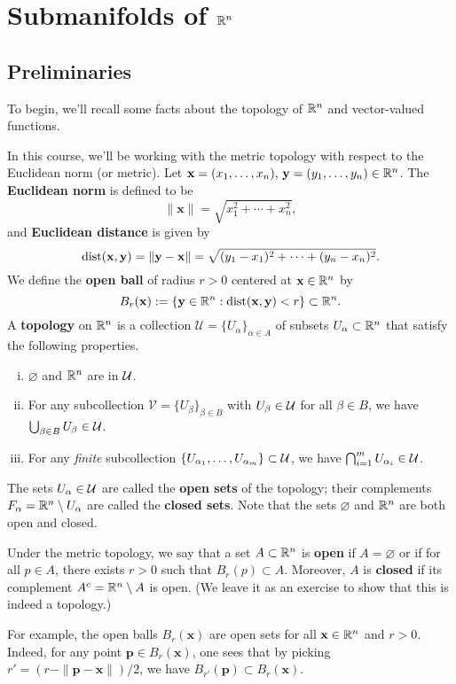 \section{Submanifolds of $\mathbb{R}^n$}\label{sec:1}

\subsection{Preliminaries}\label{subsec:1.1}
To begin, we'll recall some facts about the topology of $\mathbb{R}^n$ and 
vector-valued functions. 

In this course, we'll be working with the metric topology with respect 
to the Euclidean norm (or metric). Let $\mathbf{x} = (x_1, \dots, x_n),\,
\mathbf{y} = (y_1, \dots, y_n) \in \mathbb{R}^n$.
The {\bf Euclidean norm} is defined to be 
\[ \|\mathbf x\| = \sqrt{x_1^2 + \cdots + x_n^2}, \] 
and {\bf Euclidean distance} is given by 
\[ \operatorname{dist}(\mathbf x, \mathbf y) = \|\mathbf y - \mathbf x\| = \sqrt{(y_1 - x_1)^2 + 
\cdots + (y_n - x_n)^2}. \] 
We define the {\bf open ball} of radius $r > 0$ centered at $\mathbf x \in \mathbb{R}^n$ by 
\[ B_r(\mathbf x) := \{\mathbf y \in \mathbb{R}^n : \operatorname{dist}(\mathbf x, \mathbf y) < r\} \subset \mathbb{R}^n. \] 
A {\bf topology} on $\mathbb{R}^n$ is a collection $\mathcal{U} = \{U_\alpha\}_{\alpha \in A}$ 
of subsets $U_\alpha \subset \mathbb{R}^n$ that satisfy the following properties.
\begin{enumerate}[(i)]
    \item $\varnothing$ and $\mathbb{R}^n$ are in ${\cal U}$. 
    \item For any subcollection $\mathcal{V} = \{U_\beta\}_{\beta \in B}$ 
    with $U_\beta \in {\cal U}$ for all $\beta \in B$, we have 
    $\bigcup_{\beta \in B} U_\beta \in {\cal U}$. 
    \item For any \emph{finite} subcollection $\{U_{\alpha_1}, \dots, 
    U_{\alpha_m}\} \subset {\cal U}$, we have $\bigcap_{i=1}^m 
    U_{\alpha_i} \in {\cal U}$. 
\end{enumerate}
The sets $U_\alpha \in {\cal U}$ are called the {\bf open sets} of the topology; 
their complements $F_\alpha = \mathbb{R}^n \setminus U_\alpha$ are called the 
{\bf closed sets}. Note that the sets $\varnothing$ and $\mathbb{R}^n$ are both open and closed. 

Under the metric topology, we say that a set $A \subset \mathbb{R}^n$ is {\bf open} 
if $A = \varnothing$ or if for all $p \in A$, there exists $r > 0$ 
such that $B_r(p) \subset A$. Moreover, $A$ is {\bf closed} if its 
complement $A^c = \mathbb{R}^n \setminus A$ is open. (We leave it as an 
exercise to show that this is indeed a topology.)

For example, the open balls $B_r(\mathbf x)$ are open sets for all 
$\mathbf x \in \mathbb{R}^n$ and $r > 0$. Indeed, for any point $\mathbf p \in 
B_r(\mathbf x)$, one sees that by picking $r' = (r - \|\mathbf p - 
\mathbf x\|)/2$, we have $B_{r'}(\mathbf p) \subset B_r(\mathbf x)$. 
